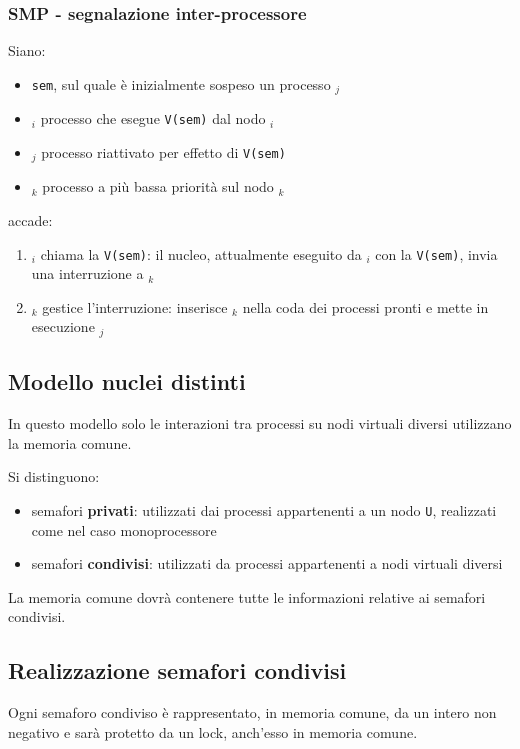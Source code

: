 \subsubsection{SMP - segnalazione inter-processore}
Siano:
\begin{itemize}
    \item \texttt{sem}, sul quale è inizialmente sospeso un processo $_j$
    \item {}$_i$ processo che esegue \texttt{V(sem)} dal nodo $_i$
    \item {}$_j$ processo riattivato per effetto di \texttt{V(sem)}
    \item {}$_k$ processo a più bassa priorità sul nodo $_k$
\end{itemize}
accade:
\begin{enumerate}
    \item {}$_i$ chiama la \texttt{V(sem)}: il nucleo, attualmente eseguito da $_i$ con la \texttt{V(sem)}, invia una interruzione a $_k$
    \item {}$_k$ gestice l'interruzione: inserisce $_k$ nella coda dei processi pronti e mette in esecuzione $_j$
\end{enumerate}

\subsection{Modello nuclei distinti}
In questo modello solo le interazioni tra processi su nodi virtuali diversi utilizzano la memoria comune.

Si distinguono:
\begin{itemize}
    \item semafori \textbf{privati}: utilizzati dai processi appartenenti a un nodo \texttt{U}, realizzati come nel caso monoprocessore
    \item semafori \textbf{condivisi}: utilizzati da processi appartenenti a nodi virtuali diversi
\end{itemize}

La memoria comune dovrà contenere tutte le informazioni relative ai semafori condivisi.

\subsection{Realizzazione semafori condivisi}
Ogni semaforo condiviso è rappresentato, in memoria comune, da un intero non negativo e sarà protetto da un lock, anch'esso in memoria comune.

